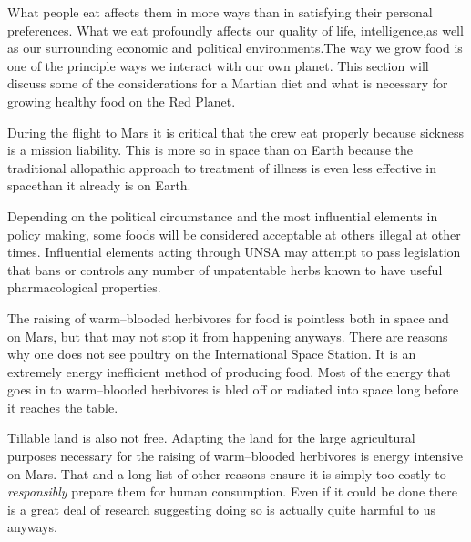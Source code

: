

What people eat affects them in more ways than in satisfying their personal preferences. What we eat profoundly affects our quality of life, intelligence, as well as our surrounding economic and political environments. The way we grow food is one of the principle ways we interact with our own planet. This section will discuss some of the considerations for a Martian diet and what is necessary for growing healthy food on the Red Planet.

During the flight to Mars it is critical that the crew eat properly because sickness is a mission liability. This is more so in space than on Earth because the traditional allopathic approach to treatment of illness is even less effective in space than it already is on Earth.

Depending on the political circumstance and the most influential elements in policy making, some foods will be considered acceptable at others illegal at other times. Influential elements acting through UNSA may attempt to pass legislation that bans or controls any number of unpatentable herbs known to have useful pharmacological properties.

The raising of warm--blooded herbivores for food is pointless both in space and on Mars, but that may not stop it from happening anyways. There are reasons why one does not see poultry on the International Space Station. It is an extremely energy inefficient method of producing food. Most of the energy that goes in to warm--blooded herbivores is bled off or radiated into space long before it reaches the table.

Tillable land is also not free. Adapting the land for the large agricultural purposes necessary for the raising of warm--blooded herbivores is energy intensive on Mars. That and a long list of other reasons ensure it is simply too costly to {\it responsibly} prepare them for human consumption. Even if it could be done there is a great deal of research suggesting doing so is actually quite harmful to us anyways.

